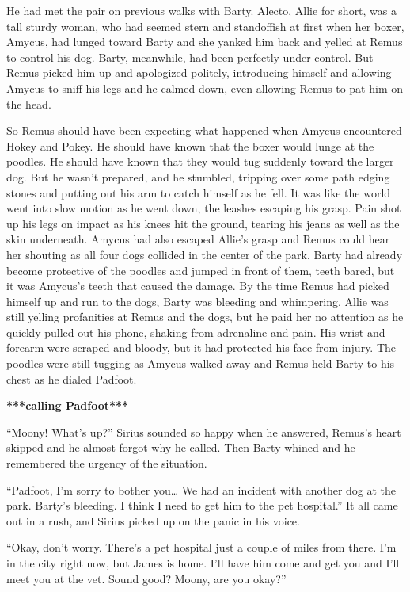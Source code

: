 \documentclass[12pt,twoside,openright]{memoir}
\begin{document}
He had met the pair on previous walks with Barty. Alecto, Allie for short, was a tall sturdy woman, who had seemed stern and standoffish at first when her boxer, Amycus, had lunged toward Barty and she yanked him back and yelled at Remus to control his dog. Barty, meanwhile, had been perfectly under control. But Remus picked him up and apologized politely, introducing himself and allowing Amycus to sniff his legs and he calmed down, even allowing Remus to pat him on the head.

So Remus should have been expecting what happened when Amycus encountered Hokey and Pokey. He should have known that the boxer would lunge at the poodles. He should have known that they would tug suddenly toward the larger dog. But he wasn't prepared, and he stumbled, tripping over some path edging stones and putting out his arm to catch himself as he fell. It was like the world went into slow motion as he went down, the leashes escaping his grasp. Pain shot up his legs on impact as his knees hit the ground, tearing his jeans as well as the skin underneath. Amycus had also escaped Allie's grasp and Remus could hear her shouting as all four dogs collided in the center of the park. Barty had already become protective of the poodles and jumped in front of them, teeth bared, but it was Amycus's teeth that caused the damage. By the time Remus had picked himself up and run to the dogs, Barty was bleeding and whimpering. Allie was still yelling profanities at Remus and the dogs, but he paid her no attention as he quickly pulled out his phone, shaking from adrenaline and pain. His wrist and forearm were scraped and bloody, but it had protected his face from injury. The poodles were still tugging as Amycus walked away and Remus held Barty to his chest as he dialed Padfoot.

\textbf{***calling Padfoot***} 

``Moony! What's up?'' Sirius sounded so happy when he answered, Remus's heart skipped and he almost forgot why he called. Then Barty whined and he remembered the urgency of the situation.

``Padfoot, I'm sorry to bother you… We had an incident with another dog at the park. Barty's bleeding. I think I need to get him to the pet hospital.'' It all came out in a rush, and Sirius picked up on the panic in his voice.

``Okay, don't worry. There's a pet hospital just a couple of miles from there. I'm in the city right now, but James is home. I'll have him come and get you and I'll meet you at the vet. Sound good? Moony, are you okay?''
\end{document}
